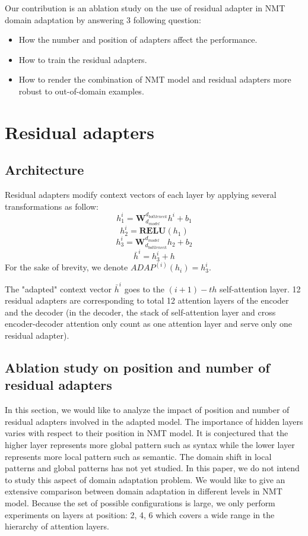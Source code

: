 \documentclass[11pt,a4paper]{article}
\begin{document}
Our contribution is an ablation study on the use of residual adapter in NMT domain adaptation by answering 3 following question:
\begin{itemize}
\item How the number and position of adapters affect the performance.
\item How to train the residual adapters.
\item How to render the combination of NMT model and residual adapters more robust to out-of-domain examples.
\end{itemize}

\section{Residual adapters \label{sec:res}}

\subsection{Architecture \label{ssec:architecture}}
Residual adapters modify context vectors of each layer by applying several transformations as follow:
$$ h^{i}_1 = \mathbf{W}_{d_{model}}^{d_{bottleneck}}h^{i} + b_{1}$$
$$ h^{i}_2 = \mathbf{RELU}(h_1)$$
$$ h^{i}_3 = \mathbf{W}_{d_{bottleneck}}^{d_{model}}h_2 + b_{2}$$
$$ \bar{h}^{i} = h^i_3 + h $$
For the sake of brevity, we denote $ADAP^{(i)}(h_i) = h^i_3$.

The "adapted" context vector $\bar{h}^i$ goes to the $(i+1)-th$ self-attention layer. 12 residual adapters are corresponding to total 12 attention layers of the encoder and the decoder (in the decoder, the stack of self-attention layer and cross encoder-decoder attention only count as one attention layer and serve only one residual adapter).
\subsection{Ablation study on position and number of residual adapters \label{ssec:ablatation}}
In this section, we would like to analyze the impact of position and number of residual adapters involved in the adapted model. The importance of hidden layers varies with respect to their position in NMT model. It is conjectured that the higher layer represents more global pattern such as syntax while the lower layer represents more local pattern such as semantic. The domain shift in local patterns and global patterns has not yet studied. In this paper, we do not intend to study this aspect of domain adaptation problem. We would like to give an extensive comparison between domain adaptation in different levels in NMT model. Because the set of possible configurations is large, we only perform experiments on layers at position: 2, 4, 6 which covers a wide range in the hierarchy of attention layers. 
\end{document}
